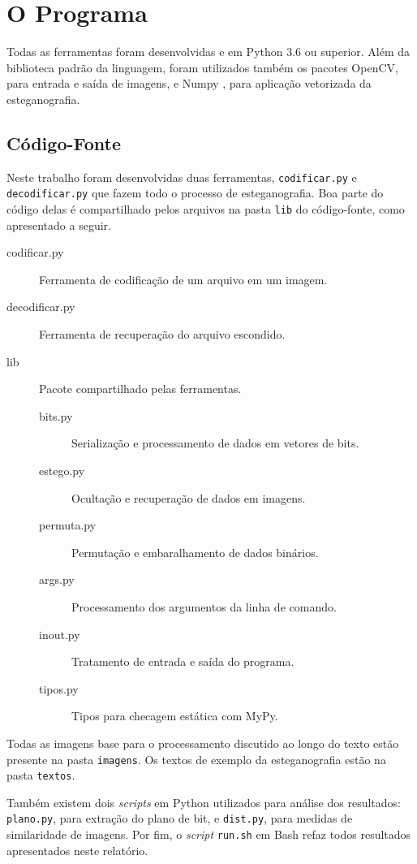 \section{O Programa}

Todas  as ferramentas foram desenvolvidas e  em Python 3.6 ou superior. Além da biblioteca padrão da linguagem, foram utilizados também os pacotes OpenCV, para entrada e saída de imagens, e Numpy , para aplicação vetorizada da esteganografia.

\subsection{Código-Fonte}

    Neste trabalho foram desenvolvidas duas ferramentas, \texttt{codificar.py} e \texttt{decodificar.py} que fazem todo o processo de esteganografia. Boa parte do código delas é compartilhado pelos arquivos na pasta \texttt{lib} do código-fonte, como apresentado a seguir.

    \begin{description}
        \item[codificar.py] Ferramenta de codificação de um arquivo em um imagem.

        \item[decodificar.py] Ferramenta de recuperação do arquivo escondido.

        \item[lib] Pacote compartilhado pelas ferramentas.

        \begin{description}
            \item[bits.py] Serialização e processamento de dados em vetores de bits.

            \item[estego.py] Ocultação e recuperação de dados em imagens.

            \item[permuta.py] Permutação e embaralhamento de dados binários.

            \item[args.py] Processamento dos argumentos da linha de comando.

            \item[inout.py] Tratamento de entrada e saída do programa.

            \item[tipos.py] Tipos para checagem estática com MyPy.
        \end{description}
    \end{description}

    Todas as imagens base para o processamento discutido ao longo do texto estão presente na pasta \texttt{imagens}. Os textos de exemplo da esteganografia estão na pasta \texttt{textos}.

    Também existem dois \textit{scripts} em Python utilizados para análise dos resultados: \texttt{plano.py}, para extração do plano de bit, e \texttt{dist.py}, para medidas de similaridade de imagens. Por fim, o \textit{script} \texttt{run.sh} em Bash refaz todos resultados apresentados neste relatório.